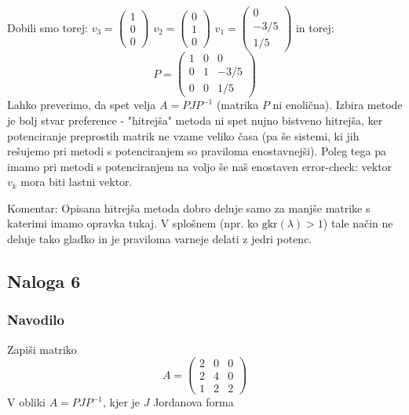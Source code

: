 \documentclass{article}
\begin{document}
Dobili smo torej:
$v_3 = \begin{pmatrix} 1 \\ 0 \\ 0 \end{pmatrix}$
$v_2 = \begin{pmatrix} 0 \\ 1 \\ 0 \end{pmatrix}$
$v_1 = \begin{pmatrix} 0 \\ -3/5 \\ 1/5 \end{pmatrix}$
in torej:
\begin{equation*}
P =
\begin{pmatrix}
1 & 0 & 0 \\
0 & 1 & -3/5 \\
0 & 0 & 1/5
\end{pmatrix}
\end{equation*}
Lahko preverimo, da spet velja $A = P J P^{-1}$ (matrika $P$ ni enolična).
Izbira metode je bolj stvar preference - "{}hitrejša"{} metoda ni spet nujno bistveno hitrejša, ker potenciranje preprostih matrik ne vzame veliko časa (pa še sistemi, ki jih rešujemo pri metodi s potenciranjem so praviloma enostavnejši). Poleg tega pa imamo pri metodi s potenciranjem na voljo še naš enostaven error-check: vektor $v_k$ mora biti lastni vektor.

\noindent
Komentar:
Opisana hitrejša metoda dobro deluje samo za manjše matrike s katerimi imamo opravka tukaj. V splošnem (npr. ko $\mathrm{gkr}(\lambda) > 1$) tale način ne deluje tako gladko in je praviloma varneje delati z jedri potenc.
\subsection*{Naloga 6}
\subsubsection*{Navodilo}
Zapiši matriko
\begin{equation*}
A = 
\begin{pmatrix}
2 & 0 & 0 \\
2 & 4 & 0 \\
1 & 2 & 2
\end{pmatrix}
\end{equation*}
V obliki $A = P J P^{-1}$, kjer je $J$ Jordanova forma
\end{document}
